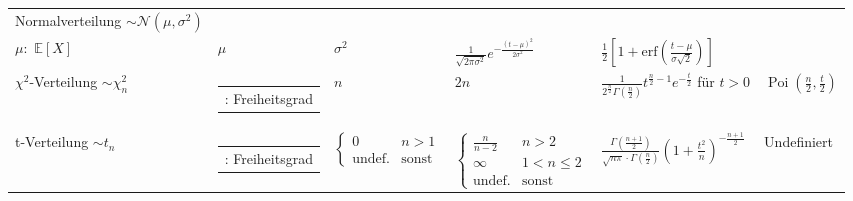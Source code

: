 \begin{table}[ht]
\begin{tabularx}{\textwidth}{|l|>{\raggedright\arraybackslash}X|>{\raggedright\arraybackslash}p{2cm}|>{\raggedright\arraybackslash}X|>{\raggedright\arraybackslash}X|>{\raggedright\arraybackslash}X|}
\hline
Normalverteilung $\sim \mathcal{N}(\mu, \sigma^2)$ & \begin{tabular}[t]{@{}p{7cm}@{}} $ \sigma^2 $:  Varianz, \\ $ \mu: $  $ \mathbb{E}[X] $ \end{tabular} & $ \mu $ & $ \sigma^2 $ & $ \frac{1}{\sqrt{2\pi \sigma^2}} e^{-\frac{(t-\mu)^2}{2\sigma^2}} $ & $ \frac{1}{2} \left[ 1 + \text{erf} \left( \frac{t-\mu}{\sigma \sqrt{2}} \right) \right] $ \\
\hline
$ \chi ^2 $-Verteilung $\sim \chi^2_n$ & \begin{tabular}[t]{@{}p{7cm}@{}} $ n $:  Freiheitsgrad \end{tabular} & $ n $ & $ 2n $ & $ \frac{1}{2^{\frac{n}{2}}\Gamma (\frac{n}{2})} t^{\frac{n}{2}-1} e^{-\frac{t}{2}} $ für $ t>0$ & $\operatorname{Poi}\left( \frac{n}{2}, \frac{t}{2}\right) $ \\
\hline
t-Verteilung $\sim t_n$ & \begin{tabular}[t]{@{}p{7cm}@{}} $ n $:  Freiheitsgrad \end{tabular} & $ \begin{cases} 0 & n>1 \\ \text{undef.} & \text{sonst} \end{cases} $ & $ \begin{cases} \frac{n}{n-2} & n> 2 \\ \infty & 1<n \leq 2 \\ \text{undef.} & \text{sonst} \end{cases} $ & $ \frac{\Gamma \left( \frac{n+1}{2} \right) }{\sqrt{n\pi } \cdot \Gamma (\frac{n}{2})} \left( 1+ \frac{t^2}{n} \right) ^{- \frac{n+1}{2}} $ & Undefiniert \\
\hline
\end{tabularx}
\end{table}


